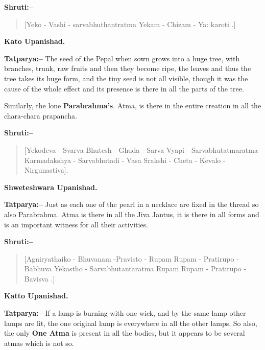 \textbf{Shruti:–}

\begin{verse}
[Yeko - Vashi - sarvabhuthantratma Yekam - Chizam - Ya: karoti .]
\end{verse}

\begin{flushright}
\textbf{Kato Upanishad.}
\end{flushright}

\textbf{Tatparya:–} The seed of the Pepal when sown grows into a huge tree, with branches, trunk, raw fruits and then they become ripe, the leaves and thus the tree takes its huge form, and the tiny seed is not all visible, though it was the cause of the whole effect and its presence is there in all the parts of the tree.

Similarly, the lone \textbf{Parabrahma's}. Atma, is there in the entire creation in all the chara-chara prapancha.

\newpage

\textbf{Shruti:–}

\begin{verse}
[Yekodeva - Svarva Bhutesh - Ghuda - Sarva Vyapi - Sarvabhutatmaratma  Karmadakshya - Sarvabhutadi - Vasa Srakshi - Cheta - Kevalo - Nirgunastiva].
\end{verse}

\begin{flushright}
\textbf{Shweteshwara Upanishad.}
\end{flushright}

\textbf{Tatparya:–} Just as each one of the pearl in a necklace are fixed in the thread so also Parabrahma. Atma is there in all the Jiva Jantus, it is there in all forms and is an important witness for all their activities.

\textbf{Shruti:–}

\begin{verse}
[Agniryathaiko - Bhuvanam -Pravisto - Rupam Rupam - Pratirupo - Babhuva  Yekastho - Sarvabhutantaratma Rupam Rupam - Pratirupo - Bavisva .]
\end{verse}

\begin{flushright}
\textbf{Katto Upanishad.}
\end{flushright}

\textbf{Tatparya:–} If a lamp is burning with one wick, and by the same lamp other lamps are lit, the one original lamp is everywhere in all the other lamps. So also, the only \textbf{One Atma} is present in all the bodies, but it appears to be several atmas which is not so.

